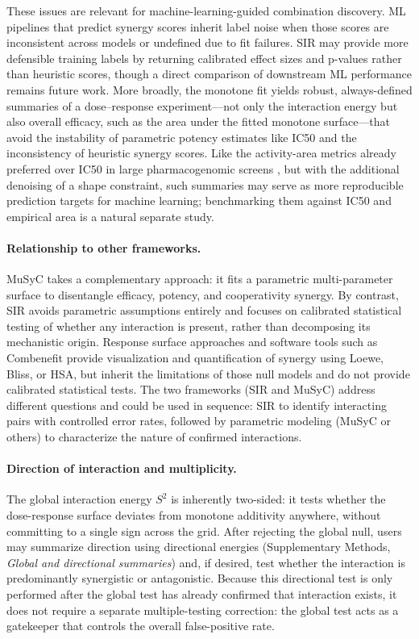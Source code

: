 \documentclass[pdflatex,sn-nature]{sn-jnl}%
\begin{document}
These issues are relevant for machine-learning-guided combination discovery.
ML pipelines that predict synergy scores \cite{DeepSynergy2018,Kuenzi2020,Menden2019} inherit label noise when those scores are inconsistent across models or undefined due to fit failures.
SIR may provide more defensible training labels by returning calibrated effect sizes and p-values rather than heuristic scores, though a direct comparison of downstream ML performance remains future work.
More broadly, the monotone fit yields robust, always-defined summaries of a dose--response experiment---not only the interaction energy but also overall efficacy, such as the area under the fitted monotone surface---that avoid the instability of parametric potency estimates like IC50 and the inconsistency of heuristic synergy scores. Like the activity-area metrics already preferred over IC50 in large pharmacogenomic screens \cite{Barretina2012}, but with the additional denoising of a shape constraint, such summaries may serve as more reproducible prediction targets for machine learning; benchmarking them against IC50 and empirical area is a natural separate study.

\paragraph{Relationship to other frameworks.}
MuSyC \cite{MuSyC2021} takes a complementary approach: it fits a parametric multi-parameter surface to disentangle efficacy, potency, and cooperativity synergy.
By contrast, SIR avoids parametric assumptions entirely and focuses on calibrated statistical testing of whether any interaction is present, rather than decomposing its mechanistic origin.
Response surface approaches \cite{Greco1995} and software tools such as Combenefit \cite{DiVeroli2016} provide visualization and quantification of synergy using Loewe, Bliss, or HSA, but inherit the limitations of those null models and do not provide calibrated statistical tests.
The two frameworks (SIR and MuSyC) address different questions and could be used in sequence: SIR to identify interacting pairs with controlled error rates, followed by parametric modeling (MuSyC or others) to characterize the nature of confirmed interactions.

\paragraph{Direction of interaction and multiplicity.}
The global interaction energy $S^2$ is inherently two-sided: it tests whether the dose-response surface deviates from monotone additivity anywhere, without committing to a single sign across the grid.
After rejecting the global null, users may summarize direction using directional energies (Supplementary Methods, \emph{Global and directional summaries}) and, if desired, test whether the interaction is predominantly synergistic or antagonistic.
Because this directional test is only performed after the global test has already confirmed that interaction exists, it does not require a separate multiple-testing correction: the global test acts as a gatekeeper that controls the overall false-positive rate.
\end{document}
